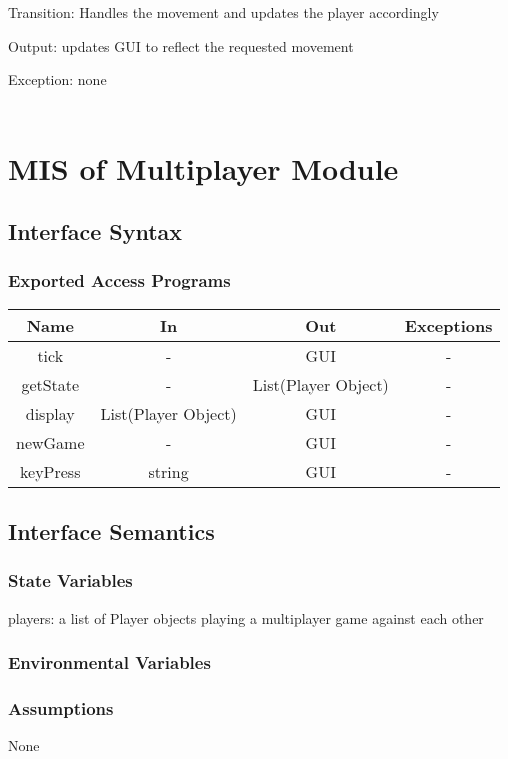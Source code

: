 \documentclass[12,english]{article}
\begin{document}
			Transition: Handles the movement and updates the player accordingly
		
			Output: updates GUI to reflect the requested movement
			
			Exception: none\\
			\\
\section{MIS of Multiplayer Module}
		\subsection{Interface Syntax}
			\subsubsection{Exported Access Programs}
				\begin{tabular}[pos]{|c|c|c|c|}
					
					\hline
					\textbf{Name}& \textbf{In} & \textbf{Out} & \textbf{Exceptions} \\ \hline
					tick &  - & GUI & -\\ \hline
					getState &  - &  List(Player Object) & -\\ \hline
					display &  List(Player Object) & GUI & -\\ \hline
					newGame &  - & GUI & -\\ \hline
					keyPress & string & GUI & -\\ \hline
 				\end{tabular}
 				\label{MultiplayerEAP}
				
		\subsection{Interface Semantics}
			\subsubsection{State Variables}
			players: a list of Player objects playing a multiplayer game against each other
			\subsubsection{Environmental Variables}
			\subsubsection{Assumptions}
			None
\end{document}
